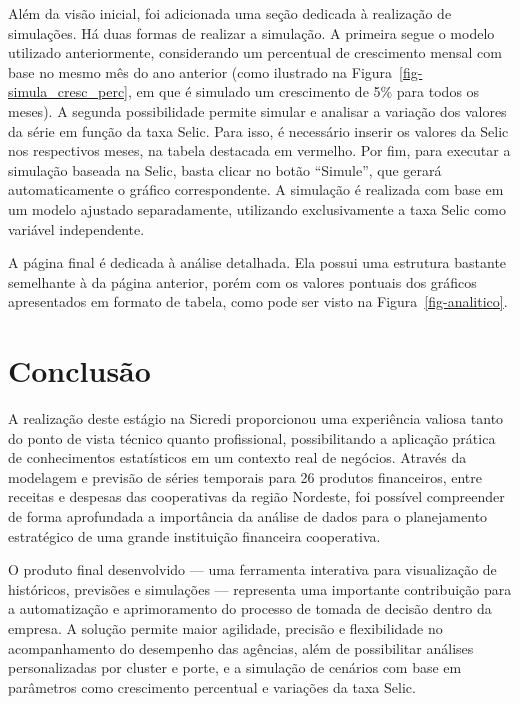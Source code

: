 \documentclass[
  12pt,
  a4paper,
]{scrreprt}
\begin{document}
Além da visão inicial, foi adicionada uma seção dedicada à realização de
simulações. Há duas formas de realizar a simulação. A primeira segue o
modelo utilizado anteriormente, considerando um percentual de
crescimento mensal com base no mesmo mês do ano anterior (como ilustrado
na Figura~\ref{fig-simula_cresc_perc}, em que é simulado um crescimento
de 5\% para todos os meses). A segunda possibilidade permite simular e
analisar a variação dos valores da série em função da taxa Selic. Para
isso, é necessário inserir os valores da Selic nos respectivos meses, na
tabela destacada em vermelho. Por fim, para executar a simulação baseada
na Selic, basta clicar no botão ``Simule'', que gerará automaticamente o
gráfico correspondente. A simulação é realizada com base em um modelo
ajustado separadamente, utilizando exclusivamente a taxa Selic como
variável independente.

\vspace{12pt}

A página final é dedicada à análise detalhada. Ela possui uma estrutura
bastante semelhante à da página anterior, porém com os valores pontuais
dos gráficos apresentados em formato de tabela, como pode ser visto na
Figura~\ref{fig-analitico}.

\chapter{Conclusão}\label{conclusuxe3o}

A realização deste estágio na Sicredi proporcionou uma experiência
valiosa tanto do ponto de vista técnico quanto profissional,
possibilitando a aplicação prática de conhecimentos estatísticos em um
contexto real de negócios. Através da modelagem e previsão de séries
temporais para 26 produtos financeiros, entre receitas e despesas das
cooperativas da região Nordeste, foi possível compreender de forma
aprofundada a importância da análise de dados para o planejamento
estratégico de uma grande instituição financeira cooperativa.

\vspace{12pt}

O produto final desenvolvido --- uma ferramenta interativa para
visualização de históricos, previsões e simulações --- representa uma
importante contribuição para a automatização e aprimoramento do processo
de tomada de decisão dentro da empresa. A solução permite maior
agilidade, precisão e flexibilidade no acompanhamento do desempenho das
agências, além de possibilitar análises personalizadas por cluster e
porte, e a simulação de cenários com base em parâmetros como crescimento
percentual e variações da taxa Selic.
\end{document}
